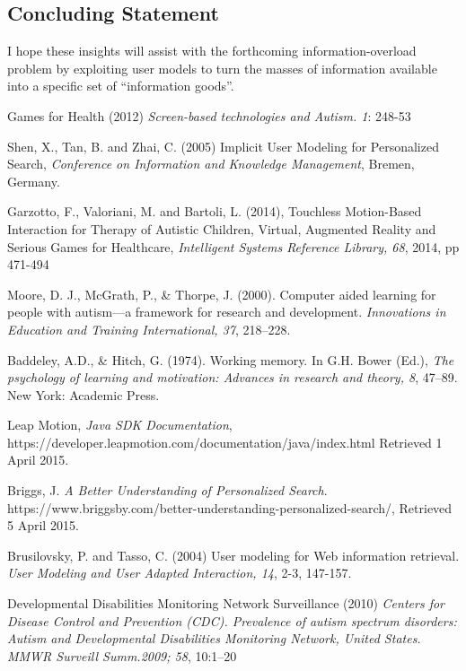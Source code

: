 \documentclass[a4paper, 10pt]{article}
\begin{document}
\subsection{Concluding Statement}\label{future}
I hope these insights will assist with the forthcoming information-overload problem by exploiting user models to turn the masses of information available into a specific set of “information goods”. 

\begin{thebibliography}{100}

 Games for Health (2012) \textit{Screen-based technologies and Autism. 1}: 248-53

Shen, X., Tan, B. and Zhai, C. (2005) Implicit User Modeling for Personalized Search, \textit{Conference on Information and Knowledge Management}, Bremen, Germany.

 Garzotto, F., Valoriani, M. and Bartoli, L. (2014), Touchless Motion-Based Interaction for Therapy of Autistic Children, Virtual, Augmented Reality and Serious Games for Healthcare, \textit{Intelligent Systems Reference Library, 68}, 2014, pp 471-494

Moore, D. J., McGrath, P., \& Thorpe, J. (2000). Computer aided learning for people with autism—a framework for research and development. \textit{Innovations in Education and Training International, 37}, 218–228.

Baddeley, A.D., \& Hitch, G. (1974). Working memory. In G.H. Bower (Ed.), \textit{The psychology of learning and motivation: Advances in research and theory, 8}, 47–89. New York: Academic Press.

 Leap Motion, \textit{Java SDK Documentation}, \\https://developer.leapmotion.com/documentation/java/index.html Retrieved 1 April 2015.

Briggs, J. \textit{A Better Understanding of Personalized Search}. https://www.briggsby.com/better-understanding-personalized-search/, Retrieved 5 April 2015.

 Brusilovsky, P. and Tasso, C. (2004) User modeling for Web information retrieval. \textit{User Modeling and User Adapted Interaction, 14}, 2-3, 147-157.


Developmental Disabilities Monitoring Network Surveillance (2010) \textit{Centers for Disease Control and Prevention (CDC). Prevalence of autism spectrum disorders: Autism and Developmental Disabilities Monitoring Network, United States. MMWR Surveill Summ.2009; 58}, 10:1–20



\end{thebibliography}
\end{document}

